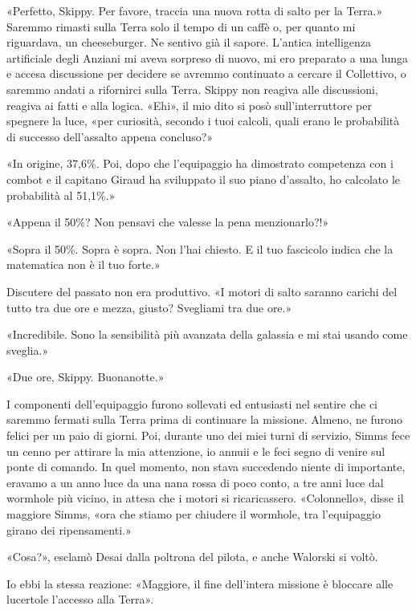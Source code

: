 «Perfetto, Skippy. Per favore, traccia una nuova rotta di salto per la
Terra.» Saremmo rimasti sulla Terra solo il tempo di un caffè o, per
quanto mi riguardava, un cheeseburger. Ne sentivo già il sapore.
L'antica intelligenza artificiale degli Anziani mi aveva sorpreso di
nuovo, mi ero preparato a una lunga e accesa discussione per decidere se
avremmo continuato a cercare il Collettivo, o saremmo andati a
rifornirci sulla Terra. Skippy non reagiva alle discussioni, reagiva ai
fatti e alla logica. «Ehi», il mio dito si posò sull'interruttore per
spegnere la luce, «per curiosità, secondo i tuoi calcoli, quali erano le
probabilità di successo dell'assalto appena concluso?»

«In origine, 37,6\%. Poi, dopo che l'equipaggio ha dimostrato competenza
con i combot e il capitano Giraud ha sviluppato il suo piano d'assalto,
ho calcolato le probabilità al 51,1\%.»

«Appena il 50\%? Non pensavi che valesse la pena menzionarlo?!»

«Sopra il 50\%. Sopra è sopra. Non l'hai chiesto. E il tuo fascicolo
indica che la matematica non è il tuo forte.»

Discutere del passato non era produttivo. «I motori di salto saranno
carichi del tutto tra due ore e mezza, giusto? Svegliami tra due ore.»

«Incredibile. Sono la sensibilità più avanzata della galassia e mi stai
usando come sveglia.»

«Due ore, Skippy. Buonanotte.»

\hfill\break

I componenti dell'equipaggio furono sollevati ed entusiasti nel sentire
che ci saremmo fermati sulla Terra prima di continuare la missione.
Almeno, ne furono felici per un paio di giorni. Poi, durante uno dei
miei turni di servizio, Simms fece un cenno per attirare la mia
attenzione, io annuii e le feci segno di venire sul ponte di comando. In
quel momento, non stava succedendo niente di importante, eravamo a un
anno luce da una nana rossa di poco conto, a tre anni luce dal wormhole
più vicino, in attesa che i motori si ricaricassero. «Colonnello», disse
il maggiore Simms, «ora che stiamo per chiudere il wormhole, tra
l'equipaggio girano dei ripensamenti.»

«Cosa?», esclamò Desai dalla poltrona del pilota, e anche Walorski si
voltò.

Io ebbi la stessa reazione: «Maggiore, il fine dell'intera missione è
bloccare alle lucertole l'accesso alla Terra».

